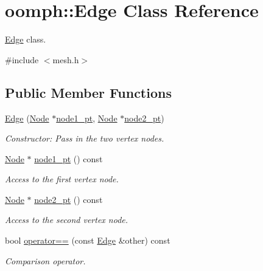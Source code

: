 \hypertarget{classoomph_1_1Edge}{}\section{oomph\+:\+:Edge Class Reference}
\label{classoomph_1_1Edge}


\hyperlink{classoomph_1_1Edge}{Edge} class.  




{\ttfamily \#include $<$mesh.\+h$>$}

\subsection*{Public Member Functions}
\begin{DoxyCompactItemize}
\item 
\hyperlink{classoomph_1_1Edge_acf82b3fc446b2673499da51baac74c4b}{Edge} (\hyperlink{classoomph_1_1Node}{Node} $\ast$\hyperlink{classoomph_1_1Edge_a88141a1bbc7f7fbdaa14489efba11c75}{node1\+\_\+pt}, \hyperlink{classoomph_1_1Node}{Node} $\ast$\hyperlink{classoomph_1_1Edge_a21b3429f05d157fcc266e4c115757289}{node2\+\_\+pt})
\begin{DoxyCompactList}\small\item\em Constructor\+: Pass in the two vertex nodes. \end{DoxyCompactList}\item 
\hyperlink{classoomph_1_1Node}{Node} $\ast$ \hyperlink{classoomph_1_1Edge_a88141a1bbc7f7fbdaa14489efba11c75}{node1\+\_\+pt} () const
\begin{DoxyCompactList}\small\item\em Access to the first vertex node. \end{DoxyCompactList}\item 
\hyperlink{classoomph_1_1Node}{Node} $\ast$ \hyperlink{classoomph_1_1Edge_a21b3429f05d157fcc266e4c115757289}{node2\+\_\+pt} () const
\begin{DoxyCompactList}\small\item\em Access to the second vertex node. \end{DoxyCompactList}\item 
bool \hyperlink{classoomph_1_1Edge_afc64c614a15316a3ee55a0c3a27cb0bf}{operator==} (const \hyperlink{classoomph_1_1Edge}{Edge} \&other) const
\begin{DoxyCompactList}\small\item\em Comparison operator. \end{DoxyCompactList}\item 

\end{DoxyCompactItemize}
